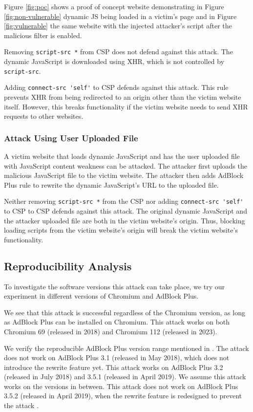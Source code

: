 \documentclass[conference]{IEEEtran}
\begin{document}
Figure \ref{fig:poc} shows a proof of concept website demonstrating in Figure \ref{fig:non-vulnerable} dynamic JS being loaded in a victim's page and in Figure \ref{fig:vulnerable} the same website with the injected attacker's script after the malicious filter is enabled.

Removing \lstinline{script-src *} from CSP does not defend against this attack. The dynamic JavaScript is downloaded using XHR, which is not controlled by \lstinline{script-src}.

Adding \lstinline{connect-src 'self'} to CSP defends against this attack. This rule prevents XHR from being redirected to an origin other than the victim website itself. However, this breaks functionality if the victim website needs to send XHR requests to other websites.

\subsubsection{Attack Using User Uploaded File}

A victim website that loads dynamic JavaScript and has the user uploaded file with JavaScript content weakness can be attacked. The attacker first uploads the malicious JavaScript file to the victim website. The attacker then adds AdBlock Plus rule to rewrite the dynamic JavaScript's URL to the uploaded file.

Neither removing \lstinline{script-src *} from the CSP nor adding \lstinline{connect-src 'self'} to CSP to CSP defends against this attack. The original dynamic JavaScript and the attacker uploaded file are both in the victim website's origin. Thus, blocking loading scripts from the victim website's origin will break the victim website's functionality.

\subsection{Reproducibility Analysis}

To investigate the software versions this attack can take place, we try our experiment in different versions of Chromium and AdBlock Plus.

We see that this attack is successful regardless of the Chromium version, as long as AdBlock Plus can be installed on Chromium. This attack works on both Chromium 69 (released in 2018) and Chromium 112 (released in 2023).

We verify the reproducible AdBlock Plus version range mentioned in \cite{abp_code_injection}. The attack does not work on AdBlock Plus 3.1 (released in May 2018), which does not introduce the rewrite feature yet. This attack works on AdBlock Plus 3.2 (released in July 2018) and 3.5.1 (released in April 2019). We assume this attack works on the versions in between. This attack does not work on AdBlock Plus 3.5.2 (released in April 2019), when the rewrite feature is redesigned to prevent the attack \cite{cr4chrome_abp}.
\end{document}
